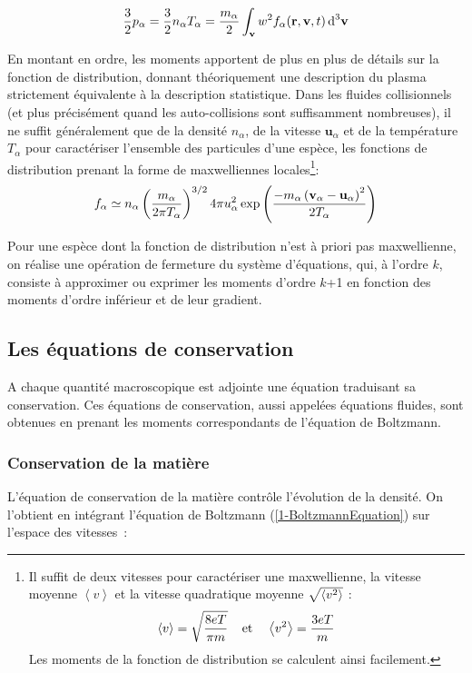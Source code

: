 \begin{refsection}
\begin{equation}
\frac{3}{2}p_\alpha=\frac{3}{2}n_\alpha
T_\alpha=\frac{m_\alpha}{2}\int_{\mathbf v} w^{{2}} f_\alpha(\mathbf
r,\mathbf v,t) \,\text{d}^{{3}}\mathbf{v}
\end{equation}

En montant en ordre, les moments apportent de plus en plus de détails sur la
fonction de distribution, donnant théoriquement une description du plasma
strictement équivalente à la description statistique. Dans les fluides
collisionnels (et plus précisément quand les auto-collisions sont suffisamment
nombreuses), il ne suffit généralement que de la densité $n_\alpha$, de la
vitesse $\mathbf{u}_\alpha$ et de la température $T_\alpha$ pour caractériser l'ensemble des particules d'une espèce, les fonctions de distribution
prenant la forme de maxwelliennes locales\footnote{Il suffit de deux vitesses
pour caractériser une maxwellienne, la vitesse moyenne $\left<v\right>$ et la vitesse quadratique moyenne $\sqrt{\left<v^{{2}}\right>}$ :
$$
	\left<v\right>=\sqrt{\frac{8eT}{\pi m}} \;\;\;\;\text{et}\;\;\;\; 
	\left<v^{{2}}\right>=\frac{3eT}{m}
$$ 
Les moments de la fonction de distribution se calculent ainsi facilement.}:
\begin{equation}
\label{1-MaxwellDistribution}
	f_\alpha\simeq n_\alpha
	\left(\frac{m_\alpha}{2\pi
	T_\alpha}\right)^{{3/2}}4\pi
	u_\alpha^{{2}}\exp\left(\frac{-m_\alpha \left(\mathbf
	v_\alpha-\mathbf u_\alpha\right)^{{2}}}{2T_\alpha}\right)
\end{equation}

Pour une espèce dont la fonction de distribution n'est à priori pas
maxwellienne, on réalise une opération de fermeture du système d'équations, qui,
à l'ordre $k$, consiste à approximer ou exprimer les moments d'ordre $k$+1
en fonction des moments d'ordre inférieur et de leur gradient.

\subsection{Les équations de conservation}

A chaque quantité macroscopique est adjointe une équation traduisant sa
conservation. Ces équations de conservation, aussi appelées équations fluides,
sont obtenues en prenant les moments correspondants de l'équation de Boltzmann.

\subsubsection{Conservation de la matière}
L'équation de conservation de la matière contrôle
l'évolution de la densité. On l'obtient en intégrant
l'équation de Boltzmann (\eqref{1-BoltzmannEquation}) sur l'espace des
vitesses~:


\end{refsection}
